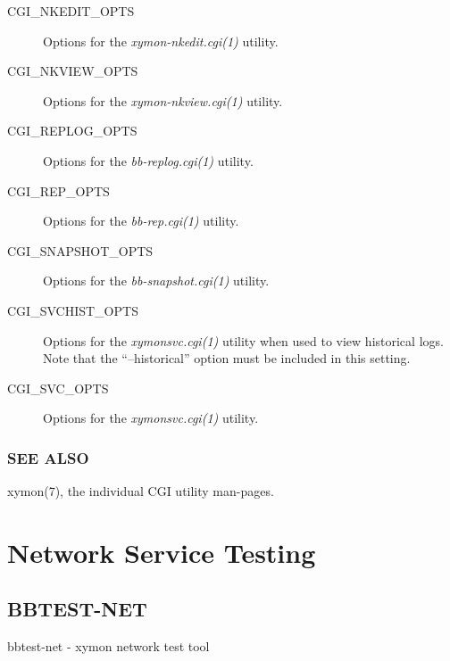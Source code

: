 \begin{description}
 

\item[CGI\_NKEDIT\_OPTS] Options for the \emph{xymon-nkedit.cgi(1)}
 utility. 

 

\item[CGI\_NKVIEW\_OPTS] Options for the \emph{xymon-nkview.cgi(1)}
 utility. 

 

\item[CGI\_REPLOG\_OPTS] Options for the \emph{bb-replog.cgi(1)}
 utility. 

 

\item[CGI\_REP\_OPTS] Options for the \emph{bb-rep.cgi(1)}
 utility. 

 

\item[CGI\_SNAPSHOT\_OPTS] Options for the \emph{bb-snapshot.cgi(1)}
 utility. 

 

\item[CGI\_SVCHIST\_OPTS] Options for the \emph{xymonsvc.cgi(1)}
 utility when used to view historical logs. Note that the ``--historical'' option must be included in this setting. 

 

\item[CGI\_SVC\_OPTS] Options for the \emph{xymonsvc.cgi(1)}
 utility. 

 


\end{description}
\subsection{SEE ALSO}
xymon(7), the individual CGI utility man-pages. 




%
\chapter{Network Service Testing}

%
\section{BBTEST-NET}
 bbtest-net - xymon network test tool 


